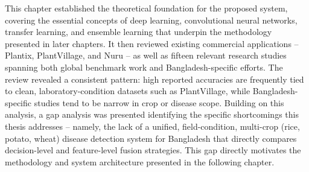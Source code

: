 This chapter established the theoretical foundation for the proposed system, covering the essential concepts of deep learning, convolutional neural networks, transfer learning, and ensemble learning that underpin the methodology presented in later chapters. It then reviewed existing commercial applications -- Plantix, PlantVillage, and Nuru -- as well as fifteen relevant research studies spanning both global benchmark work and Bangladesh-specific efforts. The review revealed a consistent pattern: high reported accuracies are frequently tied to clean, laboratory-condition datasets such as PlantVillage, while Bangladesh-specific studies tend to be narrow in crop or disease scope. Building on this analysis, a gap analysis was presented identifying the specific shortcomings this thesis addresses -- namely, the lack of a unified, field-condition, multi-crop (rice, potato, wheat) disease detection system for Bangladesh that directly compares decision-level and feature-level fusion strategies. This gap directly motivates the methodology and system architecture presented in the following chapter.